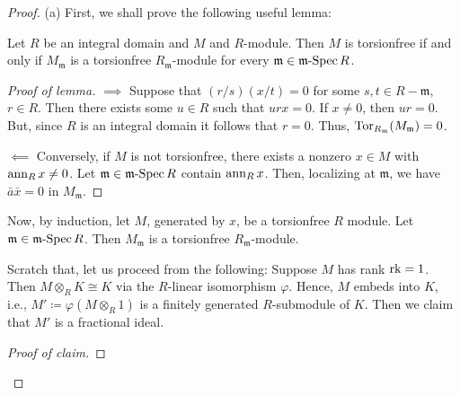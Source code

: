 \begin{proof}
(a) First, we shall prove the following useful lemma:
\begin{lemma*}
Let $R$ be an integral domain and $M$ and $R$-module. Then $M$ is
torsionfree if and only if $M_{\mathfrak{m}}$ is a torsionfree
$R_{\mathfrak{m}}$-module for every $\mathfrak{m}\in\operatorname{\mathfrak{m}-Spec} R$.
\end{lemma*}
\begin{proof}[Proof of lemma]
\renewcommand{\qedsymbol}{$\clubsuit$}
$\implies$ Suppose that $(r/s)(x/t)=0$ for some $s,t\in
R\minus\mathfrak{m}$, $r\in R$. Then there exists some $u\in R$ such that
$urx=0$. If $x\neq 0$, then $ur=0$. But, since $R$ is an integral domain it
follows that $r=0$. Thus, $\operatorname{Tor}_{R_\mathfrak{m}}(M_{\mathfrak{m}})=0$.

$\impliedby$ Conversely, if $M$ is not torsionfree, there exists a nonzero
$x\in M$ with $\operatorname{ann}_R x\neq 0$. Let $\mathfrak{m}\in\operatorname{\mathfrak{m}-Spec} R$ contain
$\operatorname{ann}_R x$. Then, localizing at $\mathfrak{m}$, we have $\bar a\bar x=0$ in
$M_{\mathfrak{m}}$.
\end{proof}
Now, by induction, let $M$, generated by $x$, be a torsionfree $R$
module. Let $\mathfrak{m}\in\operatorname{\mathfrak{m}-Spec} R$. Then $M_{\mathfrak{m}}$ is a
torsionfree $R_{\mathfrak{m}}$-module.

Scratch that, let us proceed from the following: Suppose $M$ has rank
$\operatorname{rk}=1$. Then $M\otimes_R K\cong K$ via the $R$-linear isomorphism
$\varphi$. Hence, $M$ embeds into $K$, i.e., $M'\coloneqq\varphi(M\otimes_R
1)$ is a finitely generated $R$-submodule of $K$. Then we claim that $M'$
is a fractional ideal.
\begin{proof}[Proof of claim]
\renewcommand\qedsymbol{$\clubsuit$}

\end{proof}
\end{proof}

